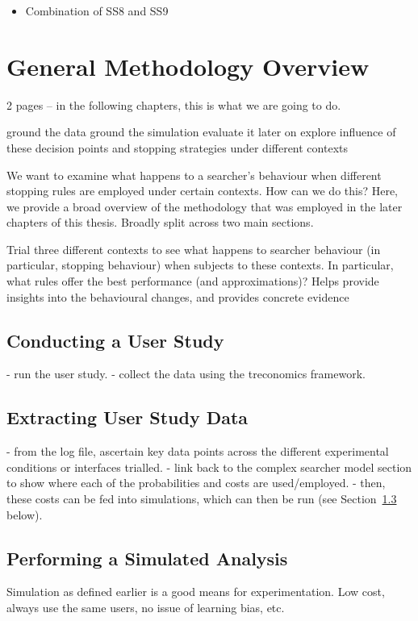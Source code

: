 \begin{itemize}
    \item[\blueboxbold{SS10}] Combination of SS8 and SS9
\end{itemize}

\section{General Methodology Overview}\label{sec:proposal:method}

2 pages -- in the following chapters, this is what we are going to do.

ground the data
ground the simulation
evaluate it later on
explore influence of these decision points and stopping strategies under different contexts

We want to examine what happens to a searcher's behaviour when different stopping rules are employed under certain contexts.
How can we do this? Here, we provide a broad overview of the methodology that was employed in the later chapters of this thesis. Broadly split across two main sections.

Trial three different contexts to see what happens to searcher behaviour (in particular, stopping behaviour) when subjects to these contexts. In particular, what rules offer the best performance (and approximations)? Helps provide insights into the behavioural changes, and provides concrete evidence 

\subsection{Conducting a User Study}
- run the user study.
- collect the data using the treconomics framework.

\subsection{Extracting User Study Data}
- from the log file, ascertain key data points across the different experimental conditions or interfaces trialled.
- link back to the complex searcher model section to show where each of the probabilities and costs are used/employed.
- then, these costs can be fed into simulations, which can then be run (see Section~\ref{sec:proposal:method:simulations} below).

\subsection{Performing a Simulated Analysis}\label{sec:proposal:method:simulations}
Simulation as defined earlier is a good means for experimentation.
Low cost, always use the same users, no issue of learning bias, etc.

